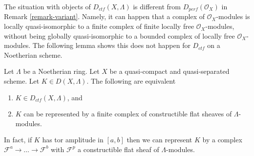 \begin{remark}
\label{remark-different}
The situation with objects of $D_{ctf}(X, \Lambda)$
is different from $D_{perf}(\mathcal{O}_X)$ in
Remark \ref{remark-variant}. Namely, it can
happen that a complex of $\mathcal{O}_X$-modules is locally quasi-isomorphic to
a finite complex of finite locally free $\mathcal{O}_X$-modules, without being
globally quasi-isomorphic to a bounded complex of locally free
$\mathcal{O}_X$-modules. The following lemma shows this does not
happen for $D_{ctf}$ on a Noetherian scheme.
\end{remark}

\begin{lemma}
\label{lemma-when-ctf}
Let $\Lambda$ be a Noetherian ring. Let $X$ be a quasi-compact
and quasi-separated scheme. Let $K \in D(X, \Lambda)$. The following
are equivalent
\begin{enumerate}
\item $K \in D_{ctf}(X, \Lambda)$, and
\item $K$ can be represented by a finite complex of constructible
flat sheaves of $\Lambda$-modules.
\end{enumerate}
In fact, if $K$ has tor amplitude in $[a, b]$ then we can represent
$K$ by a complex $\mathcal{F}^a \to \ldots \to \mathcal{F}^b$ with
$\mathcal{F}^p$ a constructible flat sheaf of $\Lambda$-modules.
\end{lemma}

